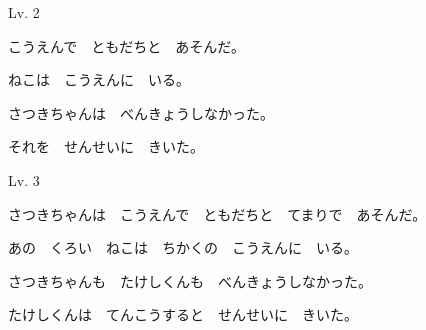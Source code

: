 	\begin{mondai}{Lv. 2}
		\item こうえんで　ともだちと　あそんだ。
		\item ねこは　こうえんに　いる。
		\item さつき\footnotemark[1]ちゃんは　べんきょうしなかった。
		\item それを　せんせいに　きいた。
	\end{mondai}
	
	
	\begin{mondai}{Lv. 3}
		\item さつきちゃんは　こうえんで　ともだちと　てまりで　あそんだ。
		\item あの　くろい　ねこは　ちかくの　こうえんに　いる。
		\item さつきちゃんも　たけし\footnotemark[2]くんも　べんきょうしなかった。
		\item たけしくんは　てんこうすると　せんせいに　きいた。
	\end{mondai}


